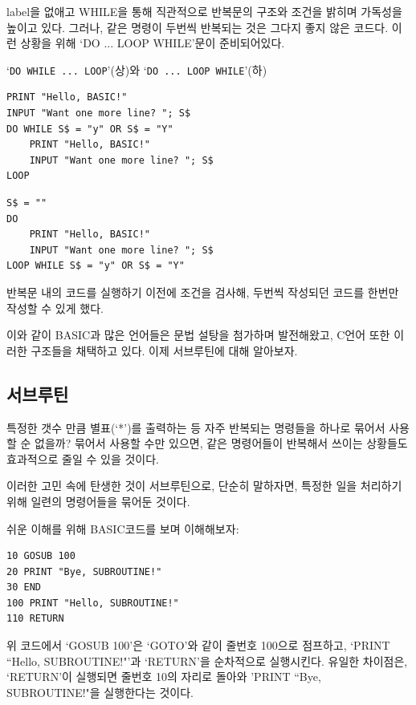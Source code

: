 \documentclass[a4paper,12pt]{book}
\newcommand{\V}[1]{\Verb|#1|}
\begin{document}
label을 없애고 WHILE을 통해 직관적으로 반복문의 구조와 조건을 밝히며 가독성을 높이고 있다.
그러나, 같은 명령이 두번씩 반복되는 것은 그다지 좋지 않은 코드다.
이런 상황을 위해 `DO ... LOOP WHILE'문이 준비되어있다.



\begin{center}
    \centering

    `\V{DO WHILE ... LOOP}'(상)와 `\V{DO ... LOOP WHILE}'(하)

\begin{lstlisting}
PRINT "Hello, BASIC!"
INPUT "Want one more line? "; S$
DO WHILE S$ = "y" OR S$ = "Y"
    PRINT "Hello, BASIC!"
    INPUT "Want one more line? "; S$
LOOP
\end{lstlisting}
\begin{lstlisting}
S$ = ""
DO
    PRINT "Hello, BASIC!"
    INPUT "Want one more line? "; S$
LOOP WHILE S$ = "y" OR S$ = "Y"
\end{lstlisting}

\end{center}

반복문 내의 코드를 실행하기 이전에 조건을 검사해, 두번씩 작성되던 코드를 한번만 작성할 수 있게 했다.

이와 같이 BASIC과 많은 언어들은 문법 설탕을 첨가하며 발전해왔고, C언어 또한 이러한 구조들을 채택하고 있다.
이제 서브루틴에 대해 알아보자.


\subsection{서브루틴}

특정한 갯수 만큼 별표(`*')를 출력하는 등 자주 반복되는 명령들을 하나로 묶어서 사용할 순 없을까?
묶어서 사용할 수만 있으면, 같은 명령어들이 반복해서 쓰이는 상황들도 효과적으로 줄일 수 있을 것이다.

이러한 고민 속에 탄생한 것이 서브루틴으로,
단순히 말하자면, 특정한 일을 처리하기 위해 일련의 명령어들을 묶어둔 것이다.

쉬운 이해를 위해 BASIC코드를 보며 이해해보자:

\begin{lstlisting}
10 GOSUB 100
20 PRINT "Bye, SUBROUTINE!"
30 END
100 PRINT "Hello, SUBROUTINE!"
110 RETURN
\end{lstlisting}

위 코드에서 `GOSUB 100'은 `GOTO'와 같이 줄번호 100으로 점프하고,
`PRINT ``Hello, SUBROUTINE!"'과 `RETURN'을 순차적으로 실행시킨다.
유일한 차이점은, `RETURN'이 실행되면 줄번호 10의 자리로 돌아와
'PRINT ``Bye, SUBROUTINE!"을 실행한다는 것이다.
\end{document}
